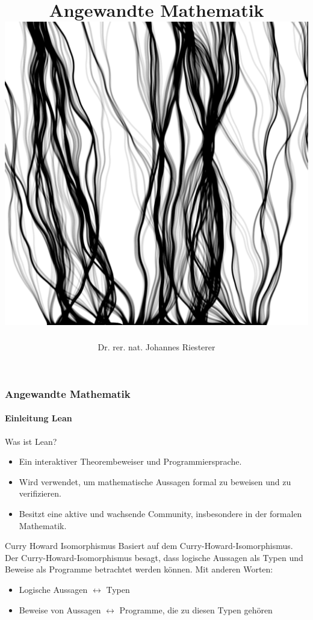 \documentclass{beamer}
\begin{document}
\title[Angewandte Mathematik] %
{Angewandte Mathematik
\\
\includegraphics[scale=0.15]{images/cover}
}
\subtitle{}
\author[Dr. Johannes Riesterer] %
{Dr.  rer. nat. Johannes Riesterer}

\date[KPT 2004] %
{}

\subject{Angewandte Mathematik}

\frame{\titlepage}


\begin{frame}
    \frametitle{Angewandte Mathematik}
\framesubtitle{Einleitung Lean}
    \begin{block}{Was ist Lean?}
        \begin{itemize}
            \item Ein interaktiver Theorembeweiser und Programmiersprache.
            \item Wird verwendet, um mathematische Aussagen formal zu beweisen und zu verifizieren.
            \item Besitzt eine aktive und wachsende Community, insbesondere in der formalen Mathematik.
        \end{itemize}
    \end{block}

\begin{block}{Curry Howard Isomorphismus}
     Basiert auf dem Curry-Howard-Isomorphismus.
     Der Curry-Howard-Isomorphismus besagt, dass logische Aussagen als Typen und Beweise als Programme betrachtet werden können. Mit anderen Worten:
    \begin{itemize}
        \item Logische Aussagen $\leftrightarrow$ Typen
    
        \item Beweise von Aussagen $\leftrightarrow$  Programme, die zu diesen Typen gehören
    \end{itemize}
    \end{block}
 \end{frame}
\end{document}
